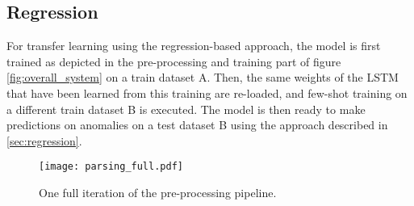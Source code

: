 \subsection{Regression \label{sec:transfer_regression}}
For transfer learning using the regression-based approach, the model is first trained as depicted in the pre-processing and training part of figure \ref{fig:overall_system} on a train dataset A. Then, the same weights of the LSTM that have been learned from this training are re-loaded, and few-shot training on a different train dataset B is executed. The model is then ready to make predictions on anomalies on a test dataset B using the approach described in \ref{sec:regression}.



\begin{figure}[htb]
  \centering
  \texttt{[image: parsing\_full.pdf]}\\
  \caption{One full iteration of the pre-processing pipeline.}
  \label{fig:full_preprocessing_pipeline}
\end{figure}







